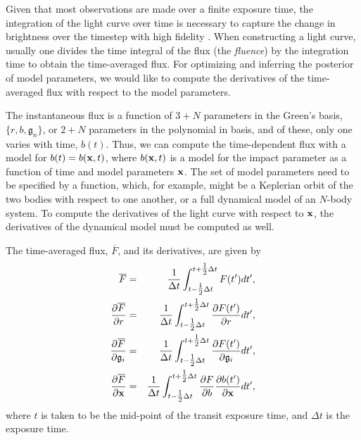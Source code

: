 \documentclass[modern,trackchanges]{aastex63}
\begin{document}
Given that most observations are made over a finite exposure time,
the integration of the light curve over time is necessary to capture the
change in brightness over the timestep
with high fidelity \citep[e.g.,][]{Kipping2010}. When constructing
a light curve, usually one divides the time integral of the flux (the \emph{fluence})
by the integration time
to obtain the time-averaged flux. For optimizing and inferring the
posterior of model parameters, we would like to compute the derivatives
of the time-averaged flux with respect to the model parameters.

The instantaneous flux is a function of $3+N$ parameters in the Green's basis,
$\{r,b,\mathfrak{g}_n\}$, or $2+N$ parameters in the polynomial in basis, and of
these, only one varies with time, $b(t)$.  Thus, we can compute the
time-dependent flux with a model for $b(t)=b({\mathbf{x}},t)$, where
$b({\mathbf{x}},t)$ is a model for the impact parameter as a function of time
and model parameters ${\mathbf{x}}$.  The set of model parameters need to be specified
by a function, which, for example, might be a Keplerian orbit of the two bodies
with respect to one another, or a full dynamical model of an $N$-body system.
To compute the derivatives of the light curve with respect to ${\mathbf{x}}$, the
derivatives of the dynamical model must be computed as well.

The time-averaged flux, $\overline{F}$, and its derivatives, are given by
\begin{eqnarray}\label{eq:avg_flux}
\overline{F} &=& \frac{1}{\Delta t} \int_{t-\tfrac{1}{2}\Delta t}^{t+\tfrac{1}{2}\Delta t} F(t^\prime) dt^\prime,\\
\frac{\partial \overline{F}}{\partial r} &=& \frac{1}{\Delta t} \int_{t-\tfrac{1}{2}\Delta t}^{t+\tfrac{1}{2}\Delta t} \frac{\partial F(t^\prime)}{\partial r} dt^\prime,\\
\frac{\partial \overline{F}}{\partial \mathfrak{g}_i}&=& \frac{1}{\Delta t} \int_{t-\tfrac{1}{2}\Delta t}^{t+\tfrac{1}{2}\Delta t} \frac{\partial F(t^\prime)}{\partial \mathfrak{g}_i} dt^\prime,\\
\frac{\partial \overline{F}}{\partial {\ensuremath{\mathbf{x}}}} &=& \frac{1}{\Delta t}
\int_{t-\tfrac{1}{2}\Delta t}^{t+\tfrac{1}{2}\Delta t} \frac{\partial F}{\partial b}\frac{\partial b(t^\prime)}{\partial {\ensuremath{\mathbf{x}}}} dt^\prime,
\end{eqnarray}
where $t$ is taken to be the mid-point of the transit exposure time, and
$\Delta t$ is the exposure time.
\end{document}
